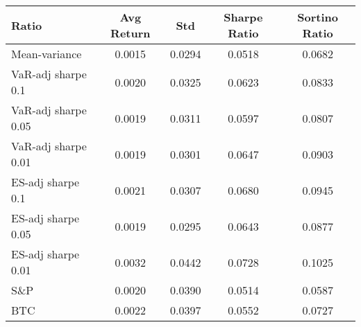 \begin{tabular}{lcccc}
\toprule
Ratio & Avg Return & Std & Sharpe Ratio & Sortino Ratio\\
\midrule
Mean-variance & 0.0015 & 0.0294 & 0.0518 & 0.0682\\
VaR-adj sharpe 0.1 & 0.0020 & 0.0325 & 0.0623 & 0.0833\\
VaR-adj sharpe 0.05 & 0.0019 & 0.0311 & 0.0597 & 0.0807\\
VaR-adj sharpe 0.01 & 0.0019 & 0.0301 & 0.0647 & 0.0903\\
ES-adj sharpe 0.1 & 0.0021 & 0.0307 & 0.0680 & 0.0945\\
ES-adj sharpe 0.05 & 0.0019 & 0.0295 & 0.0643 & 0.0877\\
ES-adj sharpe 0.01 & 0.0032 & 0.0442 & 0.0728 & 0.1025\\
S\&P & 0.0020 & 0.0390 & 0.0514 & 0.0587\\
BTC & 0.0022 & 0.0397 & 0.0552 & 0.0727\\
\bottomrule
\end{tabular}
